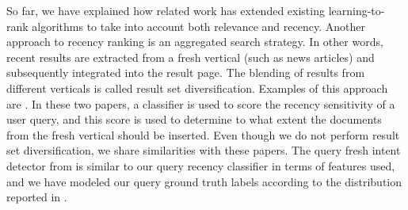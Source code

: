 So far, we have explained how related work has extended existing learning-to-rank algorithms to take into account both relevance and recency. Another approach to recency ranking is an aggregated search strategy. In other words, recent results are extracted from a fresh vertical (such as news articles) and subsequently integrated into the result page. The blending of results from different verticals is called result set diversification. Examples of this approach are \citep{lefortier2014online,styskin2011recency}. In these two papers, a classifier is used to score the recency sensitivity of a user query, and this score is used to determine to what extent the documents from the fresh vertical should be inserted. Even though we do not perform result set diversification, we share similarities with these papers. The query fresh intent detector from \citep{lefortier2014online} is similar to our query recency classifier in terms of features used, and we have modeled our query ground truth labels according to the distribution reported in \citep{styskin2011recency}.